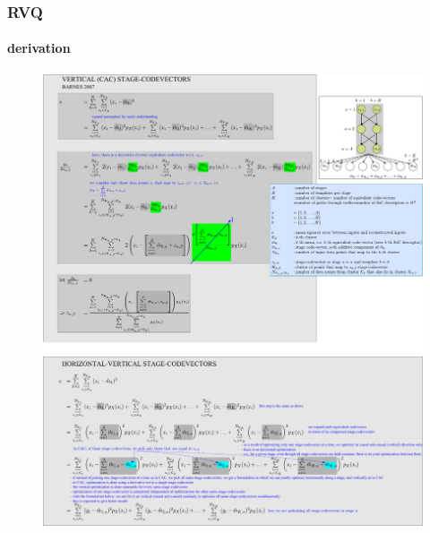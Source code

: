 \begin{frame}[plain]
\frametitle{RVQ}
\framesubtitle{derivation}
\logoCSIPCPL\mypagenum
	\begin{changemargin}{-1.3in}{0in}
		\begin{figure}				
			\includegraphics[width=1.3\textwidth]{thesis/RVQ_CAC_derivation.pdf}
		\end{figure}
	\end{changemargin}
\end{frame}


